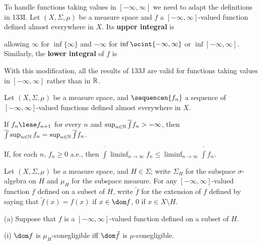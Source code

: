  To handle functions
taking values in $[-\infty,\infty]$ we need to adapt the definitions in
133I.   Let $(X,\Sigma,\mu)$ be a measure space and $f$ a
$[-\infty,\infty]$-valued function defined almost everywhere in $X$.    Its
{\bf upper integral} is


\noindent allowing $\infty$ for $\inf\{\infty\}$ and $-\infty$ for
$\inf\ocint{-\infty,\infty}$ or $\inf[-\infty,\infty]$.
Similarly, the {\bf lower integral} of $f$ is


\noindent With this modification, all the results of 133J
are valid for functions taking values in $[-\infty,\infty]$ rather than
in $\Bbb R$.

   Let $(X,\Sigma,\mu)$ be a measure space, and
$\sequencen{f_n}$ a
sequence of $[-\infty,\infty]$-valued functions defined almost
everywhere in $X$.

\medskip

 If $f_n\leae f_{n+1}$ for every $n$ and
$\sup_{n\in\Bbb N}\overline{\int}f_n>-\infty$, then
$\overline{\int}\sup_{n\in\Bbb N}f_n
=\sup_{n\in\Bbb N}\overline{\int}f_n$.

\medskip

 If, for each $n$, $f_n\ge 0$ a.e., then
$\overline{\int}\liminf_{n\to\infty}f_n
\le\liminf_{n\to\infty}\overline{\int}f_n$.

 Let $(X,\Sigma,\mu)$ be a measure space,
and $H\in\Sigma$;  write $\Sigma_H$ for the subspace $\sigma$-algebra on
$H$ and $\mu_H$ for the subspace measure.   For any
$[-\infty,\infty]$-valued function $f$ defined on a subset of $H$, write
$\tilde f$ for the extension of $f$ defined by saying that
$\tilde f(x)=f(x)$ if $x\in\dom f$, $0$ if
$x\in X\setminus H$.

(a) Suppose that $f$ is a $[-\infty,\infty]$-valued function defined on a
subset of $H$.

\quad(i) $\dom f$ is $\mu_H$-conegligible iff $\dom\tilde f$ is
$\mu$-conegligible.

